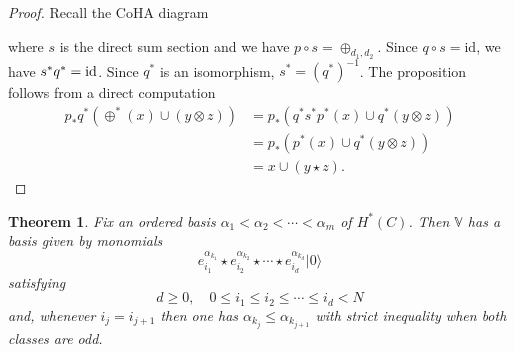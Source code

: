 \documentclass[10pt]{amsart}
\newcommand{\Coh}{\textnormal{Coh}}
\newcommand{\id}{\textnormal{id}}
\newcommand{\+}{{}^+}
\newcommand{\vac}{|0\rangle}
\newtheorem{theorem}{Theorem}[section]
\theoremstyle{definition}
\theoremstyle {definition}
\theoremstyle {definition}
\begin{document}
\begin{proof}
Recall the CoHA diagram
\begin{center}
\end{center}
where $s$ is the direct sum section and we have $p\circ s=\oplus_{d_1,d_2}$. Since $q\circ s=\mathrm{id}$, we have $s^{*}q^{*}=\id$. Since $q^{*}$ is an isomorphism, $s^{*} = (q^{*})^{-1}$. The proposition follows from a direct computation
\begin{align*}
   p_{*}q^{*}(\oplus^{*}(x) \cup (y \otimes z)) &=  p_{*}(q^{*}s^{*}p^{*}(x) \cup q^{*}(y \otimes z)) \\ 
   &= p_{*}(p^{*}(x) \cup q^{*}(y \otimes z)) \\ 
   &= x \cup (y \star z).
\end{align*}
\end{proof}



\begin{theorem}\label{thm: Nakajima type basis} 
Fix an ordered basis $\alpha_1 < \alpha_2 <  \cdots< \alpha_m $ of $H^{*}(C)$. Then $\mathbb{V}$ has a basis given by monomials \[ e^{\alpha_{k_1}}_{i_1} \star e^{\alpha_{k_2}}_{i_2} \star \cdots \star e^{\alpha_{k_d}}_{i_d} \vac \] satisfying 
\[ d\geq 0,\quad 0\leq i_1 \leq i_2\leq \cdots \leq i_d < N\] and, whenever $i_j=i_{j+1}$ then one has $\alpha_{k_j} \leq \alpha_{k_{j+1}}$ with strict inequality when both classes are odd. 
\end{theorem}
\end{document}
